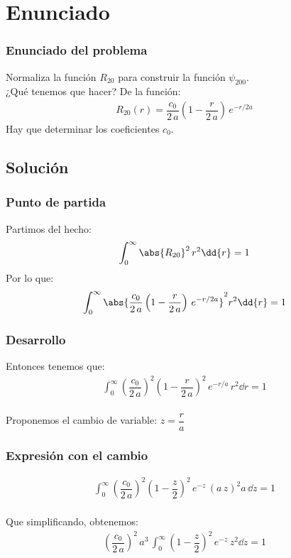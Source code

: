\section{Enunciado}
\begin{frame}
\frametitle{Enunciado del problema}
Normaliza la función $R_{20}$ para construir la función $\psi_{200}$.
\\
\bigskip
\pause
¿Qué tenemos que hacer? \pause
De la función:
\begin{align*}
R_{20}(r) = \dfrac{c_{0}}{2 \, a} \left( 1 - \dfrac{r}{2 \, a} \right) \, e^{-r/2a}
\end{align*}
Hay que determinar los coeficientes $c_{0}$.
\end{frame}
\subsection{Solución}
\begin{frame}
\frametitle{Punto de partida}
Partimos del hecho:
\begin{align*}
\int_{0}^{\infty} \abs{R_{20}}^{2} \, r^{2} \dd{r} = 1
\end{align*}
\pause
Por lo que:
\begin{align*}
\int_{0}^{\infty} \abs{ \dfrac{c_{0}}{2 \, a} \left( 1 - \dfrac{r}{2 \, a} \right) \, e^{-r/2a} }^{2} r^{2} \dd{r} = 1
\end{align*}
\end{frame}
\begin{frame}
\frametitle{Desarrollo}
Entonces tenemos que:
\begin{align*}
\int_{0}^{\infty} \left(\dfrac{c_{0}}{2 \, a}\right)^{2} \left( 1 - \dfrac{r}{2 \, a} \right)^{2} \, e^{-r/a} \, r^{2} \dd{r} = 1
\end{align*}
\\
\bigskip
\pause
Proponemos el cambio de variable: $z = \dfrac{r}{a}$
\end{frame}
\begin{frame}
\frametitle{Expresión con el cambio}
\begin{align*}
\int_{0}^{\infty} \left(\dfrac{c_{0}}{2 \, a}\right)^{2} \left( 1 - \dfrac{z}{2} \right)^{2} \, e^{-z} \, (a \, z)^{2} a \, \dd{z} = 1
\end{align*}
\\
\bigskip
\pause
Que simplificando, obtenemos:
\begin{align*}
\left(\dfrac{c_{0}}{2 \, a}\right)^{2} \, a^{3} \, \int_{0}^{\infty} \left( 1 - \dfrac{z}{2} \right)^{2} \, e^{-z} \, z^{2} \dd{z} = 1
\end{align*}
\end{frame}
